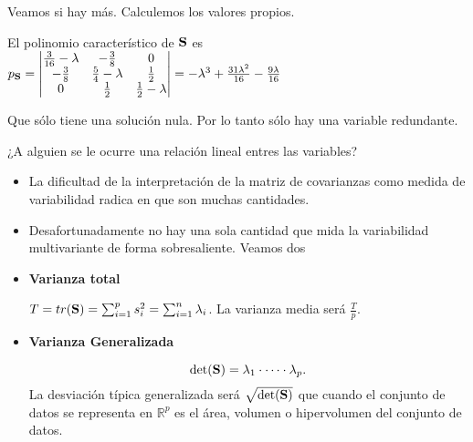 \begin{frame}
Veamos si hay más. Calculemos los valores propios.

El polinomio característico de $\mathbf{S}$ es
$p_{\mathbf{S}}=\begin{vmatrix}\frac{3}{16}-\lambda & -\frac{3}{8} & 0 \\
 -\frac{3}{8} & \frac{5}{4}-\lambda & \frac{1}{2} \\
 0 & \frac{1}{2} & \frac{1}{2}-\lambda\end{vmatrix}=-\lambda^3+\frac{31 \lambda^2}{16}-\frac{9 \lambda}{16}$
 
 Que sólo tiene una solución nula. Por lo tanto sólo hay una variable redundante.
 
 ¿A alguien se le ocurre una relación lineal entres las variables?

\end{frame}

\begin{frame}
\begin{itemize}
\item La dificultad de la interpretación de la matriz de covarianzas como medida de variabilidad radica en que son muchas cantidades. 
\item Desafortunadamente no hay una  sola cantidad que mida la variabilidad multivariante de forma sobresaliente. Veamos dos

\item \textbf{Varianza total}

$T=tr(\mathbf{S})=\sum_{i=1}^p s_i^2=\sum_{i=1}^n\lambda_i$. La varianza media será $\frac{T}{p}$.

\item \textbf{Varianza Generalizada}

$$\det(\mathbf{S})=\lambda_1\cdot\cdots \cdot\lambda_p.$$
La desviación típica generalizada será $\sqrt{\det(\mathbf{S})}$ que  cuando el conjunto de datos se representa en $\mathbb{R}^p$ es el área, volumen o hipervolumen del conjunto de datos.
\end{itemize}
\end{frame}

